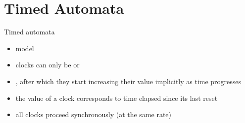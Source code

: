 \documentclass[aspectratio=169]{beamer}
\begin{document}
\section{Timed Automata} %

\begin{slide}{Timed automata}
\small


\begin{itemize}
\item {} model
\item clocks can only be  or
\item {}, after which they start increasing their value implicitly as time progresses
\item the value of a clock corresponds to time elapsed since its last reset 
\item all clocks proceed synchronously (at the same rate)
\end{itemize}

\end{slide}
\end{document}
